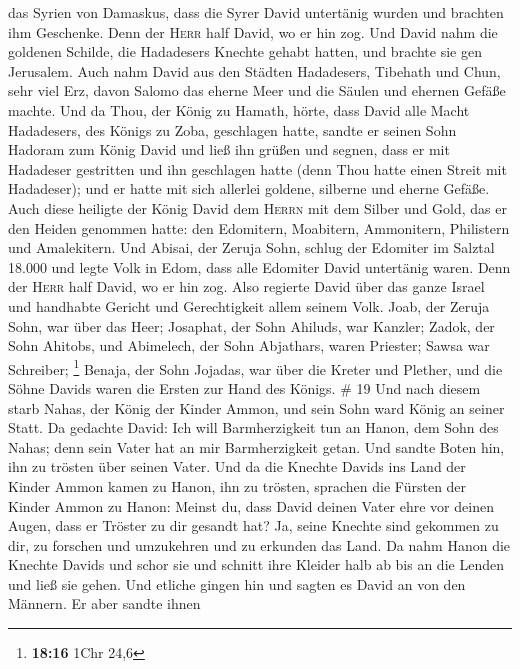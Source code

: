 das Syrien von Damaskus, dass die Syrer David untertänig wurden und
brachten ihm Geschenke. Denn der \textsc{Herr} half David, wo er hin
zog.  Und David nahm die goldenen Schilde, die Hadadesers
Knechte gehabt hatten, und brachte sie gen Jerusalem. 
Auch nahm David aus den Städten Hadadesers, Tibehath und Chun, sehr viel
Erz, davon Salomo das eherne Meer und die Säulen und ehernen Gefäße
machte.  Und da Thou, der König zu Hamath, hörte, dass
David alle Macht Hadadesers, des Königs zu Zoba, geschlagen hatte,
 sandte er seinen Sohn Hadoram zum König David und ließ
ihn grüßen und segnen, dass er mit Hadadeser gestritten und ihn
geschlagen hatte (denn Thou hatte einen Streit mit Hadadeser); und er
hatte mit sich allerlei goldene, silberne und eherne Gefäße.
 Auch diese heiligte der König David dem \textsc{Herrn}
mit dem Silber und Gold, das er den Heiden genommen hatte: den
Edomitern, Moabitern, Ammonitern, Philistern und Amalekitern.
 Und Abisai, der Zeruja Sohn, schlug der Edomiter im
Salztal 18.000  und legte Volk in Edom, dass alle
Edomiter David untertänig waren. Denn der \textsc{Herr} half David, wo
er hin zog.  Also regierte David über das ganze Israel
und handhabte Gericht und Gerechtigkeit allem seinem Volk.
 Joab, der Zeruja Sohn, war über das Heer; Josaphat, der
Sohn Ahiluds, war Kanzler;  Zadok, der Sohn Ahitobs, und
Abimelech, der Sohn Abjathars, waren Priester; Sawsa war Schreiber;
\footnote{\textbf{18:16} 1Chr 24,6}  Benaja, der Sohn
Jojadas, war über die Kreter und Plether, und die Söhne Davids waren die
Ersten zur Hand des Königs. \# 19  Und nach diesem starb
Nahas, der König der Kinder Ammon, und sein Sohn ward König an seiner
Statt.  Da gedachte David: Ich will Barmherzigkeit tun an
Hanon, dem Sohn des Nahas; denn sein Vater hat an mir Barmherzigkeit
getan. Und sandte Boten hin, ihn zu trösten über seinen Vater. Und da
die Knechte Davids ins Land der Kinder Ammon kamen zu Hanon, ihn zu
trösten,  sprachen die Fürsten der Kinder Ammon zu Hanon:
Meinst du, dass David deinen Vater ehre vor deinen Augen, dass er
Tröster zu dir gesandt hat? Ja, seine Knechte sind gekommen zu dir, zu
forschen und umzukehren und zu erkunden das Land.  Da nahm
Hanon die Knechte Davids und schor sie und schnitt ihre Kleider halb ab
bis an die Lenden und ließ sie gehen.  Und etliche gingen
hin und sagten es David an von den Männern. Er aber sandte ihnen
